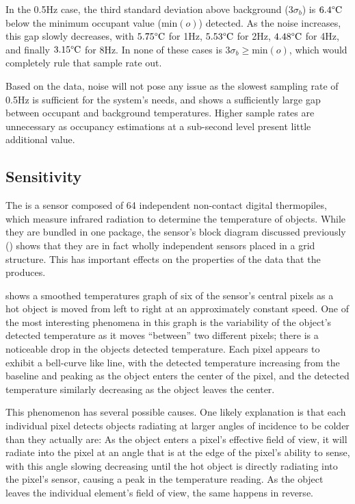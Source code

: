 \documentclass[../thesis/thesis.tex]{subfiles}
\begin{document}
In the 0.5Hz case, the third standard deviation above background ($3\sigma_b$) is $6.4\degree\textrm{C}$ below the minimum occupant value ($\mathrm{min}(o)$) detected. As the noise increases, this gap slowly decreases, with $5.75\degree\textrm{C}$ for 1Hz, $5.53\degree\textrm{C}$ for 2Hz, $4.48\degree\textrm{C}$ for 4Hz, and finally $3.15\degree\textrm{C}$ for 8Hz. In none of these cases is $3\sigma_b \ge \mathrm{min}(o)$, which would completely rule that sample rate out.

Based on the data, noise will not pose any issue as the slowest sampling rate of 0.5Hz is sufficient for the system's needs, and shows a sufficiently large gap between occupant and background temperatures. Higher sample rates are unnecessary as occupancy estimations at a sub-second level present little additional value.


\subsection{Sensitivity}
\label{subsec:sensitivity}

The \mlx is a sensor composed of 64 independent non-contact digital thermopiles, which measure infrared radiation to determine the temperature of objects. While they are bundled in one package, the sensor's block diagram discussed previously () shows that they are in fact wholly independent sensors placed in a grid structure. This has important effects on the properties of the data that the \mlx produces. 

 shows a smoothed temperatures graph of six of the sensor's central pixels as a hot object is moved from left to right at an approximately constant speed. One of the most interesting phenomena in this graph is the variability of the object's detected temperature as it moves ``between'' two different pixels; there is a noticeable drop in the objects detected temperature. Each pixel appears to exhibit a bell-curve like line, with the detected temperature increasing from the baseline and peaking as the object enters the center of the pixel, and the detected temperature similarly decreasing as the object leaves the center. 

This phenomenon has several possible causes. One likely explanation is that each individual pixel detects objects radiating at larger angles of incidence to be colder than they actually are: As the object enters a pixel's effective field of view, it will radiate into the pixel at an angle that is at the edge of the pixel's ability to sense, with this angle slowing decreasing until the hot object is directly radiating into the pixel's sensor, causing a peak in the temperature reading. As the object leaves the individual element's field of view, the same happens in reverse.
\end{document}
